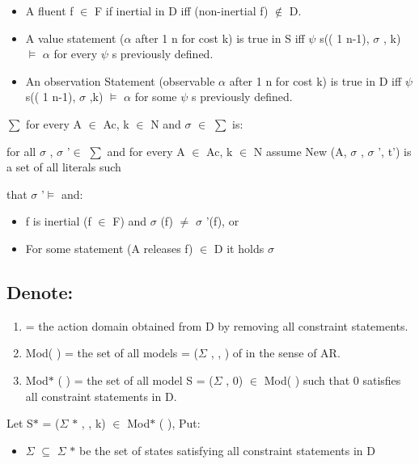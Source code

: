 \documentclass[11pt]{article}
\begin{document}
\begin{itemize}
	\item A fluent f $ \in $  F if inertial in D iff (non-inertial f) $ \notin $  D.\par

	\item A value statement ($ \alpha $  after 1 n for cost k) is true in S iff $ \psi $ s(( 1 n-1), $ \sigma $ , k) $\vDash$  $ \alpha $  for every $ \psi $ s previously defined.\par

	\item An observation Statement (observable $ \alpha $  after 1 n for cost k) is true in D iff $ \psi $ s(( 1 n-1), $ \sigma $ ,k) $\vDash$  $ \alpha $  for some $ \psi $ s previously defined.\par
	\end{itemize}
$ \sum $  for every A $ \in $  Ac, k $ \in $  N and $ \sigma $  $ \in $  $ \sum $  is:\par
for all $\sigma$ , $\sigma$ \textquoteright $\in$  $\sum$ and for every A $\in$ Ac, k $\in$ N assume New (A, $ \sigma $ , $ \sigma $ \textquoteright, t\textquoteright) is a set of all literals such\par
that $ \sigma $ \textquoteright $\vDash$  and:\par
\begin{itemize}
	\item f is inertial (f $ \in $  F) and $ \sigma $ (f) $ \neq $  $ \sigma $ \textquoteright(f), or\par

	\item For some statement (A releases f) $ \in $  D it holds $ \sigma $ 
\end{itemize}\par
\subsection{Denote:}
\begin{enumerate}
	\item = the action domain obtained from D by removing all constraint statements.\par

	\item Mod( ) = the set of all models = ($  \Sigma  $ , , ) of in the sense of AR.\par

	\item Mod$\ast$ ( ) = the set of all model S = ($  \Sigma  $ , 0) $ \in $  Mod( ) such that 0 satisfies all constraint statements in D.
\end{enumerate}\par
Let S$\ast$  = ($  \Sigma  $ $\ast$ , , k) $ \in $  Mod$\ast$ ( ), Put:\par
\begin{itemize}
	\item $  \Sigma  $  $ \subseteq $  $  \Sigma  $ $\ast$  be the set of states satisfying all constraint statements in D
\end{itemize}\par
\end{document}
